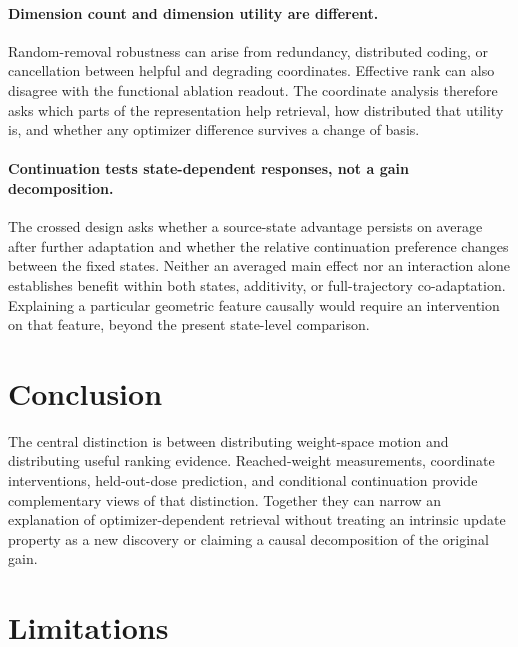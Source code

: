 \documentclass[11pt]{article}
\begin{document}
\paragraph{Dimension count and dimension utility are different.}
Random-removal robustness can arise from redundancy, distributed coding, or cancellation between
helpful and degrading coordinates. Effective rank can also disagree with the functional ablation
readout. The coordinate analysis therefore asks which parts of the representation help retrieval,
how distributed that utility is, and whether any optimizer difference survives a change of basis.

\paragraph{Continuation tests state-dependent responses, not a gain decomposition.}
The crossed design asks whether a source-state advantage persists on average after further
adaptation and whether the relative continuation preference changes between the fixed states.
Neither an averaged main effect nor an interaction alone establishes benefit within both states,
additivity, or full-trajectory co-adaptation. Explaining a particular geometric feature causally
would require an intervention on that feature, beyond the present state-level comparison.

\FloatBarrier

\section{Conclusion}

\CorrectedConclusionFinding

\DimensionConclusionFinding

\StateOperatorConclusionFinding

The central distinction is between distributing weight-space motion and distributing useful ranking
evidence. Reached-weight measurements, coordinate interventions, held-out-dose prediction, and
conditional continuation provide complementary views of that distinction. Together they can narrow
an explanation of optimizer-dependent retrieval without treating an intrinsic update property as a
new discovery or claiming a causal decomposition of the original gain.

\label{paper-main-end}

\section{Limitations}
\end{document}
